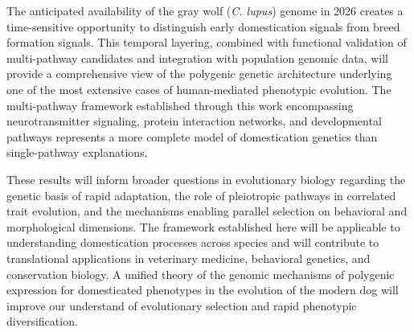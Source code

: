 \documentclass[11pt,letterpaper]{article}
\begin{document}
The anticipated availability of the gray wolf (\textit{C. lupus}) genome in 2026 creates a time-sensitive opportunity to distinguish early domestication signals from breed formation signals. This temporal layering, combined with functional validation of multi-pathway candidates and integration with population genomic data, will provide a comprehensive view of the polygenic genetic architecture underlying one of the most extensive cases of human-mediated phenotypic evolution. The multi-pathway framework established through this work encompassing neurotransmitter signaling, protein interaction networks, and developmental pathways represents a more complete model of domestication genetics than single-pathway explanations.

These results will inform broader questions in evolutionary biology regarding the genetic basis of rapid adaptation, the role of pleiotropic pathways in correlated trait evolution, and the mechanisms enabling parallel selection on behavioral and morphological dimensions. The framework established here will be applicable to understanding domestication processes across species and will contribute to translational applications in veterinary medicine, behavioral genetics, and conservation biology. A unified theory of the genomic mechanisms of polygenic expression for domesticated phenotypes in the evolution of the modern dog will improve our understand of evolutionary selection and rapid phenotypic diversification. 



\end{document}
